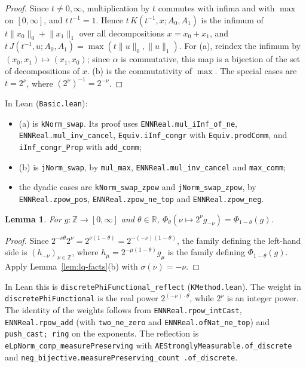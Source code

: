 \documentclass[11pt]{article}
\newtheorem{lemma}[theorem]{Lemma}
\theoremstyle{definition}
\theoremstyle{remark}
\newcommand{\norm}[2]{\lVert #1\rVert_{#2}}
\newcommand{\Z}{\mathbb Z}
\begin{document}
\begin{proof}
  Since \(t \ne 0,\infty\), multiplication by \(t\) commutes with infima and with \(\max\) on
  \([0,\infty]\), and \(t\,t^{-1} = 1\). Hence \(t\,K(t^{-1},x;A_0,A_1)\) is the infimum of
  \(t\norm{x_0}{0} + \norm{x_1}{1}\) over all decompositions \(x = x_0 + x_1\), and
  \(t\,J(t^{-1},u;A_0,A_1) = \max(t\norm{u}{0},\norm{u}{1})\).
  For (a), reindex the infimum by \((x_0,x_1) \mapsto (x_1,x_0)\); since \(\alpha\) is
  commutative, this map is a bijection of the set of decompositions of \(x\).
  (b) is the commutativity of \(\max\).
  The special cases are \(t = 2^\nu\), where \((2^\nu)^{-1} = 2^{-\nu}\).
\end{proof}

In Lean (\texttt{Basic.lean}):
\begin{itemize}
  \item (a) is \texttt{kNorm\_swap}. Its proof uses \texttt{ENNReal.mul\_iInf\_of\_ne},
    \texttt{ENNReal.mul\_inv\_cancel}, \texttt{Equiv.iInf\_congr} with
    \texttt{Equiv.prodComm}, and \texttt{iInf\_congr\_Prop} with \texttt{add\_comm};
  \item (b) is \texttt{jNorm\_swap}, by \texttt{mul\_max}, \texttt{ENNReal.mul\_inv\_cancel}
    and \texttt{max\_comm};
  \item the dyadic cases are \texttt{kNorm\_swap\_zpow} and \texttt{jNorm\_swap\_zpow}, by
    \texttt{ENNReal.zpow\_pos}, \texttt{ENNReal.zpow\_ne\_top} and \texttt{ENNReal.zpow\_neg}.
\end{itemize}

\begin{lemma}\label{lem:reflect}
  For \(g \colon \Z \to [0,\infty]\) and \(\theta \in \mathbb R\),
  \(\Phi_\theta(\nu \mapsto 2^\nu g_{-\nu}) = \Phi_{1-\theta}(g)\).
\end{lemma}

\begin{proof}
  Since \(2^{-\nu\theta}2^\nu = 2^{\nu(1-\theta)} = 2^{-(-\nu)(1-\theta)}\), the family
  defining the left-hand side is \((h_{-\nu})_{\nu\in\Z}\), where
  \(h_\mu = 2^{-\mu(1-\theta)} g_\mu\) is the family defining \(\Phi_{1-\theta}(g)\). Apply
  Lemma~\ref{lem:lq-facts}(b) with \(\sigma(\nu) = -\nu\).
\end{proof}

In Lean this is \texttt{discretePhiFunctional\_reflect} (\texttt{KMethod.lean}). The weight in
\texttt{discretePhiFunctional} is the real power
\(2^{(-\nu)\cdot\theta}\), while \(2^\nu\) is an integer power. The identity of the weights
follows from \texttt{ENNReal.rpow\_intCast}, \texttt{ENNReal.rpow\_add} (with
\texttt{two\_ne\_zero} and \texttt{ENNReal.ofNat\_ne\_top}) and \texttt{push\_cast; ring} on
the exponents. The reflection is \texttt{eLpNorm\_comp\_measurePreserving} with
\texttt{AEStronglyMeasurable.of\_discrete} and
\texttt{neg\_bijective.measurePreserving\_count .of\_discrete}.
\end{document}
